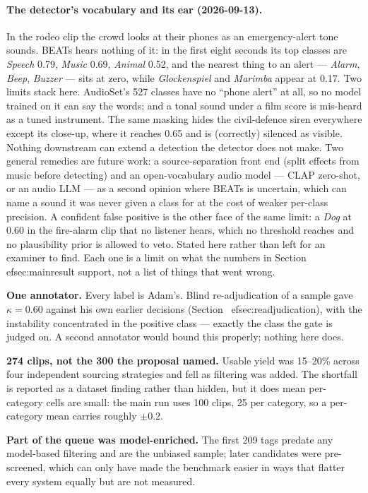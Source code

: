 \documentclass[11pt,a4paper]{article}
\begin{document}
\paragraph{The detector's vocabulary and its ear (2026-09-13).} In the rodeo clip the
crowd looks at their phones as an emergency-alert tone sounds. BEATs hears nothing of it:
in the first eight seconds its top classes are \emph{Speech} 0.79, \emph{Music} 0.69,
\emph{Animal} 0.52, and the nearest thing to an alert --- \emph{Alarm}, \emph{Beep},
\emph{Buzzer} --- sits at zero, while \emph{Glockenspiel} and \emph{Marimba} appear at 0.17.
Two limits stack here. AudioSet's 527 classes have no ``phone alert'' at all, so no model
trained on it can say the words; and a tonal sound under a film score is mis-heard as a
tuned instrument. The same masking hides the civil-defence siren everywhere except its
close-up, where it reaches 0.65 and is (correctly) silenced as visible. Nothing downstream
can extend a detection the detector does not make. Two general remedies are future work:
a source-separation front end (split effects from music before detecting) and an
open-vocabulary audio model --- CLAP zero-shot, or an audio LLM --- as a second opinion
where BEATs is uncertain, which can name a sound it was never given a class for at the
cost of weaker per-class precision. A confident false positive is the other face of the
same limit: a \emph{Dog} at 0.60 in the fire-alarm clip that no listener hears, which no
threshold reaches and no plausibility prior is allowed to veto.
Stated here rather than left for an examiner to find. Each one is a limit on what the numbers in
Section~
ef{sec:mainresult} support, not a list of things that went wrong.

\textbf{One annotator.} Every label is Adam's. Blind re-adjudication of a sample gave
$\kappa = 0.60$ against his own earlier decisions (Section~
ef{sec:readjudication}), with the
instability concentrated in the positive class --- exactly the class the gate is judged on. A second
annotator would bound this properly; nothing here does.

\textbf{274 clips, not the 300 the proposal named.} Usable yield was 15--20\% across four
independent sourcing strategies and fell as filtering was added. The shortfall is reported as a
dataset finding rather than hidden, but it does mean per-category cells are small: the main run uses
100 clips, 25 per category, so a per-category mean carries roughly $\pm 0.2$.

\textbf{Part of the queue was model-enriched.} The first 209 tags predate any model-based filtering
and are the unbiased sample; later candidates were pre-screened, which can only have made the
benchmark easier in ways that flatter every system equally but are not measured.
\end{document}
